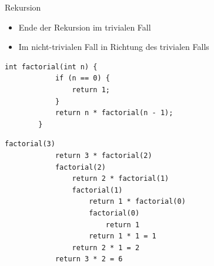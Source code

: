\documentclass[10pt]{beamer} %
\begin{document}
\begin{frame}[fragile]{Rekursion}
	
	\begin{itemize}
		\item Ende der Rekursion im trivialen Fall
		\item Im nicht-trivialen Fall  in Richtung des trivialen Falls
	\end{itemize}

	\begin{minipage}{0.4\linewidth}
	\begin{lstlisting}[gobble=4]
		int factorial(int n) {
			if (n == 0) {
				return 1;
			}
			return n * factorial(n - 1);
		}
	\end{lstlisting}
	\end{minipage}%
	\begin{minipage}{0.6\linewidth}
	\begin{lstlisting}[gobble=6,showtabs=true,tab=$\mid$,tabsize=3]
		factorial(3) 
			return 3 * factorial(2)
			factorial(2) 
				return 2 * factorial(1) 
				factorial(1) 
					return 1 * factorial(0)
					factorial(0)
						return 1 
					return 1 * 1 = 1
				return 2 * 1 = 2 
			return 3 * 2 = 6 
	\end{lstlisting}
	\end{minipage}

\end{frame}


	
	\appendix
	\setcounter{finalframe}{\value{framenumber}}
	
	\setcounter{framenumber}{\value{finalframe}}
\end{document}
